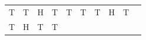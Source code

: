 {{\begin{center}
\begin{tabular}[t]{|l|l|l|l|l|l|l|l|l|l|}
        T &
        T &
        H &
        T &
        T &
        T &
        T &
        H &
        T%
     \tabularnewline\cline{1-1}\cline{2-2}\cline{3-3}\cline{4-4}\cline{5-5}\cline{6-6}\cline{7-7}\cline{8-8}\cline{9-9}\cline{10-10}
        T &
        H &
        T &
        T &

\end{tabular}
\end{center}}}
